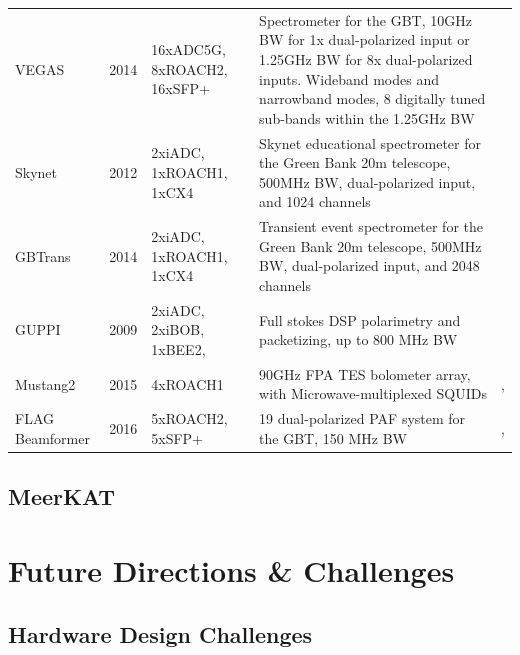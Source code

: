 \documentclass{ws-jai}
\begin{document}
\begin{landscape}
\begin{longtable}{p{3cm} c p{4cm} p{8cm} p{2cm}}
  VEGAS           & 2014 & 16xADC5G, 8xROACH2, 16xSFP+ & Spectrometer for the GBT, 10GHz BW for 1x dual-polarized input or 1.25GHz BW for 8x dual-polarized inputs. Wideband modes and narrowband modes, 8 digitally tuned sub-bands within the 1.25GHz BW                                                                                                                                                          & \cite{chennamangalam2014gpu} \\
  Skynet          & 2012 & 2xiADC, 1xROACH1, 1xCX4     & Skynet educational spectrometer for the Green Bank 20m telescope, 500MHz BW, dual-polarized input, and 1024 channels& \cite{skynet} \\
  GBTrans         & 2014 & 2xiADC, 1xROACH1, 1xCX4     & Transient event spectrometer for the Green Bank 20m telescope, 500MHz BW, dual-polarized input, and 2048 channels & \cite{gbtrans} \\
  GUPPI           & 2009 & 2xiADC, 2xiBOB, 1xBEE2,     & Full stokes DSP polarimetry and packetizing, up to 800 MHz BW                                                      & \cite{guppi} \\
  Mustang2        & 2015 & 4xROACH1                    & 90GHz FPA TES bolometer array, with Microwave-multiplexed SQUIDs                                                  & \cite{2016JLTP..184..460S} , \cite{2014JLTP..176..808D}  \\
  FLAG Beamformer & 2016 & 5xROACH2, 5xSFP+            & 19 dual-polarized PAF system for the GBT,  150 MHz BW                                                             & \cite{gb_flag} , \cite{gb_beamformer} \\
  \end{longtable}
\end{landscape}

\subsection{MeerKAT}


\section{Future Directions \& Challenges} \label{sec:Future}

\subsection{Hardware Design Challenges}
\end{document}
